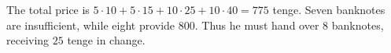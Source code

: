 The total price is $5\cdot10+5\cdot15+10\cdot25+10\cdot40=775$ tenge. Seven banknotes are insufficient, while eight provide $800$. Thus he must hand over $\boxed8$ banknotes, receiving $25$ tenge in change.
